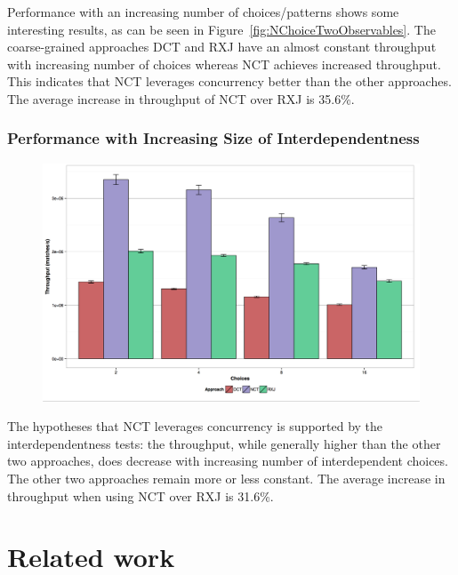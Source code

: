 \documentclass[runningheads]{llncs}
\begin{document}
\begin{sloppypar}
Performance with an increasing number of choices/patterns shows some
interesting results, as can be seen in Figure~\ref{fig:NChoiceTwoObservables}.
The coarse-grained approaches DCT and RXJ have an almost constant throughput
with increasing number of choices whereas NCT achieves increased throughput.
This indicates that NCT leverages concurrency better than the other
approaches. The average increase in throughput of NCT over RXJ is 35.6\%.

\subsubsection{Performance with Increasing Size of Interdependentness}

\begin{figure}[h]
  \centering
  \includegraphics[scale=0.30]{img/32-patterns-N-interdep.pdf}
  \caption{}
  \label{fig:}
\end{figure}

The hypotheses that NCT leverages concurrency is supported by the
interdependentness tests: the throughput, while generally higher than the
other two approaches, does decrease with increasing number of interdependent
choices. The other two approaches remain more or less constant. The average
increase in throughput when using NCT over RXJ is 31.6\%.


\section{Related work}\label{cha:related}


\end{sloppypar}
\end{document}

